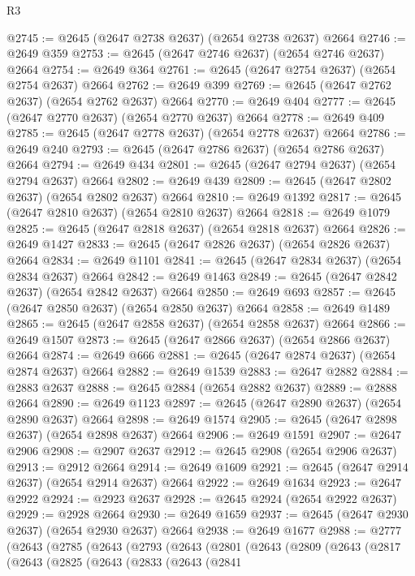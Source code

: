 \begin{lexlean}{R3}
\begin{coremodule}
@2745 := @2645 (@2647 @2738 @2637) (@2654 @2738 @2637) @2664
@2746 := @2649 @359
@2753 := @2645 (@2647 @2746 @2637) (@2654 @2746 @2637) @2664
@2754 := @2649 @364
@2761 := @2645 (@2647 @2754 @2637) (@2654 @2754 @2637) @2664
@2762 := @2649 @399
@2769 := @2645 (@2647 @2762 @2637) (@2654 @2762 @2637) @2664
@2770 := @2649 @404
@2777 := @2645 (@2647 @2770 @2637) (@2654 @2770 @2637) @2664
@2778 := @2649 @409
@2785 := @2645 (@2647 @2778 @2637) (@2654 @2778 @2637) @2664
@2786 := @2649 @240
@2793 := @2645 (@2647 @2786 @2637) (@2654 @2786 @2637) @2664
@2794 := @2649 @434
@2801 := @2645 (@2647 @2794 @2637) (@2654 @2794 @2637) @2664
@2802 := @2649 @439
@2809 := @2645 (@2647 @2802 @2637) (@2654 @2802 @2637) @2664
@2810 := @2649 @1392
@2817 := @2645 (@2647 @2810 @2637) (@2654 @2810 @2637) @2664
@2818 := @2649 @1079
@2825 := @2645 (@2647 @2818 @2637) (@2654 @2818 @2637) @2664
@2826 := @2649 @1427
@2833 := @2645 (@2647 @2826 @2637) (@2654 @2826 @2637) @2664
@2834 := @2649 @1101
@2841 := @2645 (@2647 @2834 @2637) (@2654 @2834 @2637) @2664
@2842 := @2649 @1463
@2849 := @2645 (@2647 @2842 @2637) (@2654 @2842 @2637) @2664
@2850 := @2649 @693
@2857 := @2645 (@2647 @2850 @2637) (@2654 @2850 @2637) @2664
@2858 := @2649 @1489
@2865 := @2645 (@2647 @2858 @2637) (@2654 @2858 @2637) @2664
@2866 := @2649 @1507
@2873 := @2645 (@2647 @2866 @2637) (@2654 @2866 @2637) @2664
@2874 := @2649 @666
@2881 := @2645 (@2647 @2874 @2637) (@2654 @2874 @2637) @2664
@2882 := @2649 @1539
@2883 := @2647 @2882
@2884 := @2883 @2637
@2888 := @2645 @2884 (@2654 @2882 @2637)
@2889 := @2888 @2664
@2890 := @2649 @1123
@2897 := @2645 (@2647 @2890 @2637) (@2654 @2890 @2637) @2664
@2898 := @2649 @1574
@2905 := @2645 (@2647 @2898 @2637) (@2654 @2898 @2637) @2664
@2906 := @2649 @1591
@2907 := @2647 @2906
@2908 := @2907 @2637
@2912 := @2645 @2908 (@2654 @2906 @2637)
@2913 := @2912 @2664
@2914 := @2649 @1609
@2921 := @2645 (@2647 @2914 @2637) (@2654 @2914 @2637) @2664
@2922 := @2649 @1634
@2923 := @2647 @2922
@2924 := @2923 @2637
@2928 := @2645 @2924 (@2654 @2922 @2637)
@2929 := @2928 @2664
@2930 := @2649 @1659
@2937 := @2645 (@2647 @2930 @2637) (@2654 @2930 @2637) @2664
@2938 := @2649 @1677
@2988 := @2777
    (@2643
      (@2785
        (@2643
          (@2793
            (@2643
              (@2801
                (@2643
                  (@2809
                    (@2643
                      (@2817
                        (@2643
                          (@2825
                            (@2643
                              (@2833
                                (@2643
                                  (@2841

\end{coremodule}
\end{lexlean}
